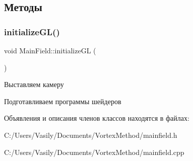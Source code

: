 \subsection{Методы}
\mbox{\label{class_main_field_a9157bc4143c8251e3c591f36254c95dd}} 
\subsubsection{\texorpdfstring{initialize\+G\+L()}{initializeGL()}}
{\footnotesize\ttfamily void Main\+Field\+::initialize\+GL (\begin{DoxyParamCaption}{ }\end{DoxyParamCaption})}

Выставляем камеру

Подготавливаем программы шейдеров 

Объявления и описания членов классов находятся в файлах\+:\begin{DoxyCompactItemize}
\item 
C\+:/\+Users/\+Vasily/\+Documents/\+Vortex\+Method/mainfield.\+h\item 
C\+:/\+Users/\+Vasily/\+Documents/\+Vortex\+Method/mainfield.\+cpp\end{DoxyCompactItemize}
